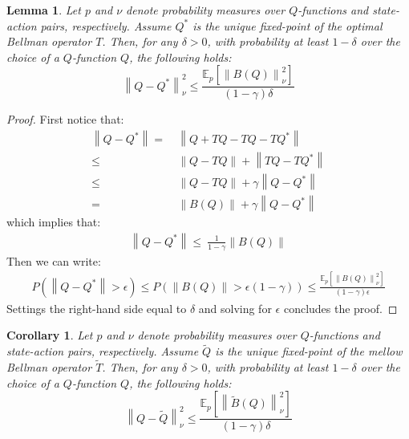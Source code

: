 \documentclass{article}
\newtheorem{lemma}{Lemma}
\newtheorem{corollary}{Corollary}
\newcommand{\wt}[1]{\widetilde{#1}}
\newcommand{\norm}[1]{\left\lVert #1 \right\rVert}
\begin{document}
\begin{lemma}
Let $p$ and $\nu$ denote probability measures over $Q$-functions and state-action pairs, respectively. Assume $Q^*$ is the unique fixed-point of the optimal Bellman operator $T$. Then, for any $\delta > 0$, with probability at least $1 - \delta$ over the choice of a $Q$-function $Q$, the following holds:
\begin{equation}
\norm{Q - Q^*}_{\nu}^2 \leq \frac{\mathbb{E}_p\left[ \norm{B(Q)}_{\nu}^2 \right]}{(1-\gamma)\delta}
\end{equation}
\end{lemma}
\begin{proof}
First notice that:
\begin{align*}
\norm{Q - Q^*} =\ & \norm{Q + TQ - TQ - TQ^*}\\ \leq\ & \norm{Q - TQ} + \norm{TQ - TQ^*}\\ \leq\ & \norm{Q - TQ} + \gamma\norm{Q - Q^*}\\ =\ & \norm{B(Q)} + \gamma\norm{Q - Q^*}
\end{align*}
which implies that:
\begin{align*}
\norm{Q - Q^*} \leq\ \frac{1}{1-\gamma}\norm{B(Q)}
\end{align*}
Then we can write:
\begin{align*}
P\left( \norm{Q - Q^*} > \epsilon \right) \leq P\left(\norm{B(Q)} > \epsilon (1-\gamma)\right) \leq \frac{\mathbb{E}_p\left[ \norm{B(Q)}_{\nu}^2 \right]}{(1-\gamma)\epsilon}
\end{align*}
Settings the right-hand side equal to $\delta$ and solving for $\epsilon$ concludes the proof.
\end{proof}

\begin{corollary}
Let $p$ and $\nu$ denote probability measures over $Q$-functions and state-action pairs, respectively. Assume $\wt{Q}$ is the unique fixed-point of the mellow Bellman operator $\wt{T}$. Then, for any $\delta > 0$, with probability at least $1 - \delta$ over the choice of a $Q$-function $Q$, the following holds:
\begin{equation}
\norm{Q - \wt{Q}}_{\nu}^2 \leq \frac{\mathbb{E}_p\left[ \norm{\wt{B}(Q)}_{\nu}^2 \right]}{(1-\gamma)\delta}
\end{equation}
\end{corollary}
\end{document}
